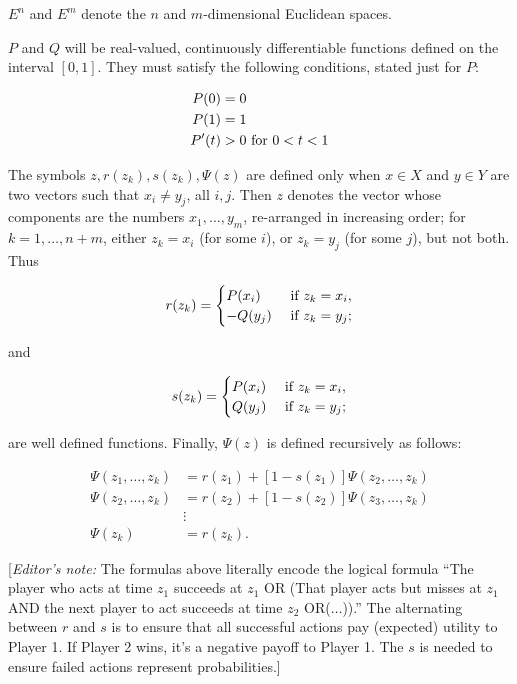 \documentclass{article}
\theoremstyle{remark}
\begin{document}
$E^n$ and $E^m$ denote the $n$ and $m$-dimensional Euclidean spaces.

$P$ and $Q$ will be real-valued, continuously differentiable functions
defined on the interval $[0,1]$. They must satisfy the following conditions,
stated just for $P$:

\[
\begin{aligned}
P(0) &= 0 \\ P(1) &= 1 \\ P'(t) &> 0 \textup{ for } 0 < t < 1
\end{aligned}
\]

The symbols $z, r(z_k), s(z_k), \Psi(z)$ are defined only when $x \in X$ and
$y \in Y$ are two vectors such that $x_i \neq y_j$, all $i, j$. Then $z$
denotes the vector whose components are the numbers $x_1, \dots, y_m$,
re-arranged in increasing order; for $k = 1, \dots, n+m$, either $z_k = x_i$
(for some $i$), or $z_k = y_j$ (for some $j$), but not both. Thus

\[
r(z_k) = \begin{cases}
P(x_i) & \textup{ if } z_k = x_i, \\
-Q(y_j) & \textup{ if } z_k = y_j;
\end{cases}
\]

and

\[
s(z_k) = \begin{cases}
P(x_i) & \textup{ if } z_k = x_i, \\
Q(y_j) & \textup{ if } z_k = y_j;
\end{cases}
\]

are well defined functions. Finally, $\Psi(z)$ is defined recursively as
follows:

\[
\begin{aligned}
\Psi(z_1, \dots, z_k) &= r(z_1) + [1 - s(z_1)] \Psi(z_2, \dots, z_k) \\
\Psi(z_2, \dots, z_k) &= r(z_2) + [1 - s(z_2)] \Psi(z_3, \dots, z_k) \\
& \vdots \\
\Psi(z_k) &= r(z_k).
\end{aligned}
\]

[\emph{Editor's note:} The formulas above literally encode the logical formula
``The player who acts at time $z_1$ succeeds at $z_1$ OR (That player acts but
misses at $z_1$ AND the next player to act succeeds at time $z_2$
OR($\dots$)).'' The alternating between $r$ and $s$ is to ensure that all
successful actions pay (expected) utility to Player 1. If Player 2 wins, it's a
negative payoff to Player 1. The $s$ is needed to ensure failed actions
represent probabilities.]
\end{document}
